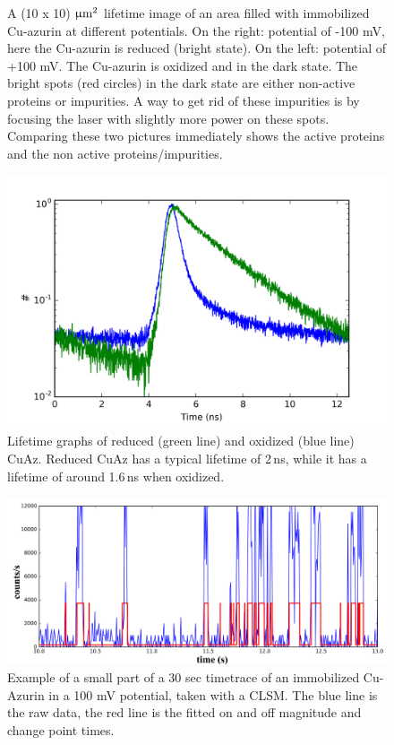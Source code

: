 \documentclass[twoside,single]{lion-msc}
\begin{document}
\begin{figure}
\begin{subfigure}{.5\textwidth}
  \label{}
\end{subfigure}
\caption{A  (10 x 10) $\upmu \textup{m}^{2}$  lifetime image of an area filled with immobilized Cu-azurin at different potentials. On the right: potential of -100 mV, here the Cu-azurin is reduced (bright state). On the left: potential of +100 mV. The Cu-azurin is oxidized and in the dark state. The bright spots (red circles) in the dark state are either non-active proteins or impurities. A way to get rid of these impurities is by focusing the laser with slightly more power on these spots. Comparing these two pictures immediately shows the active proteins and the non active proteins/impurities.}
\label{finding_proteins_1}
\end{figure}

\begin{figure}[ht!]
\centering
\includegraphics[width= .9\textwidth]{lifetime.png}
\caption{Lifetime graphs of reduced (green line) and oxidized (blue line) CuAz. Reduced CuAz has a typical lifetime of 2\,ns, while it has a lifetime of around 1.6\,ns when oxidized.} 
\label{lifetime}
\end{figure}



\begin{figure}[ht!]
\centering
\includegraphics[width= \textwidth]{tt.png}
\caption{Example of a small part of a 30 sec timetrace of an immobilized Cu-Azurin in a 100 mV potential, taken with a CLSM. The blue line is the raw data, the red line is the fitted on and off magnitude and change point times.} 
\label{TT_exam}
\end{figure}
\end{document}

